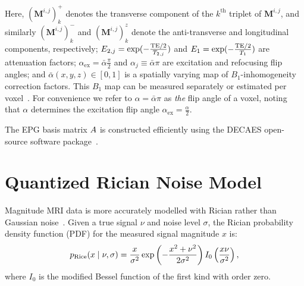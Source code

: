 Here, $(\mathbf{M}^{i,j})_k^+$ denotes the transverse component of the $k^{\text{th}}$ triplet of $\mathbf{M}^{i,j}$, and similarly $(\mathbf{M}^{i,j})_k^-$ and $(\mathbf{M}^{i,j})_k^z$ denote the anti-transverse and longitudinal components, respectively;
$E_{2,j} = \exp(-\frac{\mathrm{TE}/2}{T_{2,j}})$ and $E_{1} = \exp(-\frac{\mathrm{TE}/2}{T_{1}})$ are attenuation factors;
$\alpha_{\text{ex}} = \bar{\alpha} \frac{\pi}{2}$ and $\alpha_j \equiv \bar{\alpha} \pi$ are excitation and refocusing flip angles;
and $\bar{\alpha}(x, y, z) \in [0, 1]$ is a spatially varying map of $B_1$-inhomogeneity correction factors.
This $B_1$ map can be measured separately or estimated per voxel~\citep{prasloski_applications_2012,doucette_decaes_2020}.
For convenience we refer to $\alpha = \bar{\alpha} \pi$ as \textit{the} flip angle of a voxel, noting that $\alpha$ determines the excitation flip angle $\alpha_{\text{ex}} = \frac{\alpha}{2}$.

The \gls*{EPG} basis matrix $A$ is constructed efficiently using the \gls*{DECAES} open-source software package~\citep{doucette_decaes_2020}.

\section{Quantized Rician Noise Model}\label{sec:apx:rician_noise}

Magnitude \gls*{MRI} data is more accurately modelled with Rician rather than Gaussian noise~\citep{rice_mathematical_1944, rice_mathematical_1945, gudbjartsson_rician_1995}.
Given a true signal $\nu$ and noise level $\sigma$, the Rician probability density function (\gls*{PDF}) for the measured signal magnitude $x$ is:
\begin{align}\label{eqn:rician_pdf}
    p_{\operatorname{Rice}}(x \mid \nu, \sigma) = \frac{x}{\sigma^2} \exp\left(-\frac{x^2 + \nu^2}{2\sigma^2}\right) I_0\left(\frac{x\nu}{\sigma^2}\right),
\end{align}
where $I_0$ is the modified Bessel function of the first kind with order zero.

